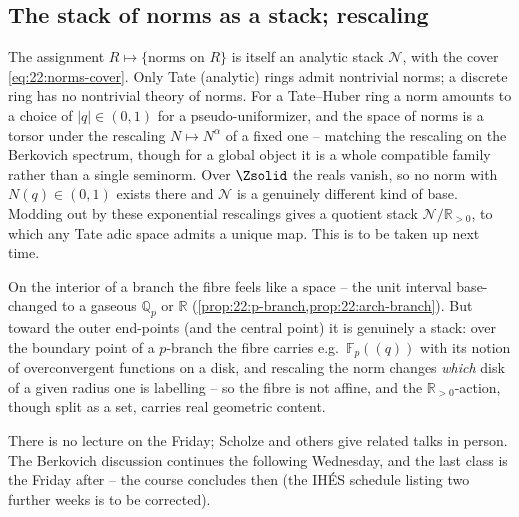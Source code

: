 \subsection{The stack of norms as a stack; rescaling}
\label{subsec:22:closing}

\begin{remark}
\label{rmk:22:tate-norms}
The assignment $R\mapsto\{\text{norms on }R\}$ is itself an analytic stack
$\mathcal N$, with the cover \eqref{eq:22:norms-cover}. Only Tate (analytic)
rings admit nontrivial norms; a discrete ring has no nontrivial theory of norms.
For a Tate--Huber ring a norm amounts to a choice of $|q|\in(0,1)$ for a
pseudo-uniformizer, and the space of norms is a torsor under the rescaling
$N\mapsto N^{\alpha}$ of a fixed one -- matching the rescaling on the Berkovich
spectrum, though for a global object it is a whole compatible family rather than
a single seminorm. Over $\Zsolid$ the reals vanish, so no norm with
$N(q)\in(0,1)$ exists there and $\mathcal N$ is a genuinely different kind of
base. Modding out by these exponential rescalings gives a quotient stack
$\mathcal N/\mathbb R_{>0}$, to which any Tate adic space admits a unique map.
This is to be taken up next time.
\end{remark}

\begin{remark}
\label{rmk:22:fibres-stacky}
On the interior of a branch the fibre feels like a space -- the unit interval
base-changed to a gaseous $\mathbb Q_p$ or $\mathbb R$
(\cref{prop:22:p-branch,prop:22:arch-branch}). But toward the outer end-points
(and the central point) it is genuinely a stack: over the boundary point of a
$p$-branch the fibre carries e.g.\ $\mathbb F_p(\!(q)\!)$ with its notion of
overconvergent functions on a disk, and rescaling the norm changes \emph{which}
disk of a given radius one is labelling -- so the fibre is not affine, and the
$\mathbb R_{>0}$-action, though split as a set, carries real geometric content.
\end{remark}

\begin{remark}[Administrative]
\label{rmk:22:admin}
There is no lecture on the Friday; Scholze and others give related talks in
person. The Berkovich discussion continues the following Wednesday, and the
last class is the Friday after -- the course concludes then (the IH\'ES
schedule listing two further weeks is to be corrected).
\end{remark}
